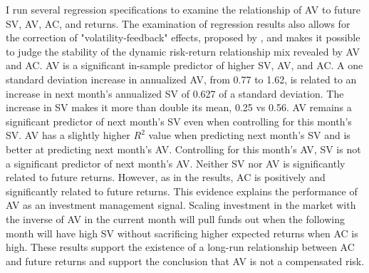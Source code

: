 I run several regression specifications to examine the relationship of AV to future SV, AV, AC, and returns. The examination of regression results also allows for the correction of "volatility-feedback" effects, proposed by \citet{campbell_no_1992}, and makes it possible to judge the stability of the dynamic risk-return relationship mix revealed by AV and AC. AV is a significant in-sample predictor of higher SV, AV, and AC.  A one standard deviation increase in annualized AV, from 0.77 to 1.62, is related to an increase in next month’s annualized SV of 0.627 of a standard deviation. The increase in SV makes it more than double its mean, 0.25 vs 0.56. AV remains a significant predictor of next month’s SV even when controlling for this month's SV. AV has a slightly higher $R^{2}$ value when predicting next month's SV and is better at predicting next month's AV. Controlling for this month's AV, SV is not a significant predictor of next month's AV. Neither SV nor AV is significantly related to future returns. However, as in the \citet{pollet_average_2010} results, AC is positively and significantly related to future returns. %
This evidence explains the performance of AV as an investment management signal. Scaling investment in the market with the inverse of AV in the current month will pull funds out when the following month will have high SV without sacrificing higher expected returns when AC is high. 
These results support the existence of a long-run relationship between AC and future returns and support the conclusion that AV is not a compensated risk. 

